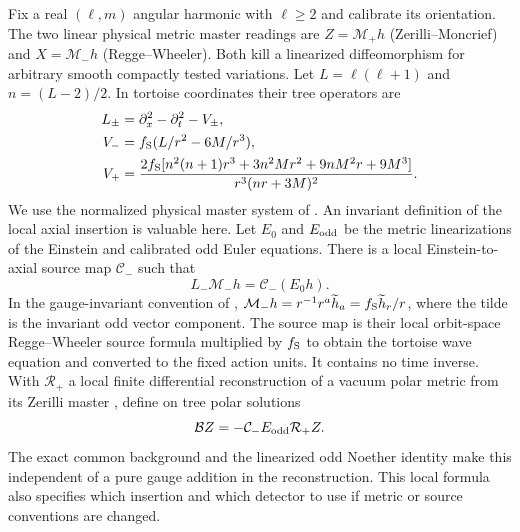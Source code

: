 \documentclass[11pt]{article}
\begin{document}
Fix a real $(\ell,m)$ angular harmonic with $\ell\ge2$ and calibrate its orientation. The two linear physical metric master readings are $Z=\mathcal M_+h$ (Zerilli--Moncrief) and $X=\mathcal M_-h$ (Regge--Wheeler). Both kill a linearized diffeomorphism for arbitrary smooth compactly tested variations. Let $L=\ell(\ell+1)$ and $n=(L-2)/2$. In tortoise coordinates their tree operators are
\begin{align}
 L_\pm&=\partial_x^2-\partial_t^2-V_\pm,\nonumber\\
 V_-&=f_{\rm S}(L/r^2-6M/r^3),\nonumber\\
 V_+&=\frac{2f_{\rm S}[n^2(n+1)r^3+3n^2Mr^2+9nM^2r+9M^3]}{r^3(nr+3M)^2}.
 \label{eq:potentials}
\end{align}
We use the normalized physical master system of \cite{P27,Cano}. An invariant definition of the local axial insertion is valuable here. Let $E_0$ and $E_{\rm odd}$ be the metric linearizations of the Einstein and calibrated odd Euler equations. There is a local Einstein-to-axial source map $\mathcal C_-$ such that
\begin{equation}\label{eq:source-reduction}
 L_-\mathcal M_-h=\mathcal C_-(E_0h).
\end{equation}
In the gauge-invariant convention of \cite[Eqs.~(5.17)--(5.20)]{MartelPoisson}, $\mathcal M_-h=r^{-1}r^a\widetilde h_a=f_{\rm S}\widetilde h_r/r$, where the tilde is the invariant odd vector component. The source map is their local orbit-space Regge--Wheeler source formula multiplied by $f_{\rm S}$ to obtain the tortoise wave equation and converted to the fixed action units. It contains no time inverse. With $\mathcal R_+$ a local finite differential reconstruction of a vacuum polar metric from its Zerilli master \cite{Moncrief,MartelPoisson}, define on tree polar solutions
\begin{equation}\label{eq:intrinsic}
 \mathcal B Z=-\mathcal C_-E_{\rm odd}\mathcal R_+Z.
\end{equation}
The exact common background and the linearized odd Noether identity make this independent of a pure gauge addition in the reconstruction. This local formula also specifies which insertion and which detector to use if metric or source conventions are changed.
\end{document}
